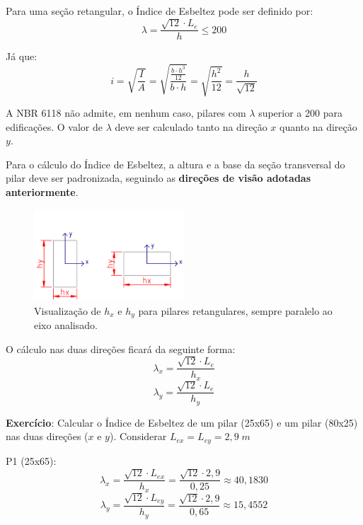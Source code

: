 Para uma seção retangular, o Índice de Esbeltez pode ser definido por:
\begin{equation}\lambda=\frac{\sqrt{12}\cdot L_e}{h}\leqslant200\end{equation}

Já que: \begin{equation}i=\sqrt{\frac{I}{A}}=\sqrt{\frac{\frac{b\cdot h^3}{12}}{b\cdot h}}=\sqrt{\frac{h^2}{12}}=\frac{h}{\sqrt{12}}\end{equation}

A NBR 6118 não admite, em nenhum caso, pilares com $\lambda$ superior a 200 para edificações. O valor de $\lambda$ deve ser calculado tanto na direção $x$ quanto na direção $y$.

Para o cálculo do Índice de Esbeltez, a altura e a base da seção transversal do pilar deve ser padronizada, seguindo as \textbf{direções de visão adotadas anteriormente}.

\begin{figure}[H]
	\begin{center}
	\caption{Visualização de $h_x$ e $h_y$ para pilares retangulares, sempre paralelo ao eixo analisado.}
    	\includegraphics[width=0.5\textwidth]{Indice-de-esbeltez/Imagens/hx-e-hy-de-secao-transversal-pilar.png}
	\end{center}
\end{figure}

O cálculo nas duas direções ficará da seguinte forma:
\begin{equation}\lambda_x=\frac{\sqrt{12}\cdot L_e}{h_x}\end{equation}
\begin{equation}\lambda_y=\frac{\sqrt{12}\cdot L_e}{h_y}\end{equation}

\textbf{Exercício}: Calcular o Índice de Esbeltez de um pilar (25x65) e um pilar (80x25) nas duas direções ($x$ e $y$). Considerar $L_{ex}=L_{ey}=2,9\;m$

P1 (25x65):
$$\lambda_x=\frac{\sqrt{12}\cdot L_{ex}}{h_x}=\frac{\sqrt{12}\cdot2,9}{0,25}\approx40,1830$$
$$\lambda_y=\frac{\sqrt{12}\cdot L_{ey}}{h_y}=\frac{\sqrt{12}\cdot2,9}{0,65}\approx15,4552$$

